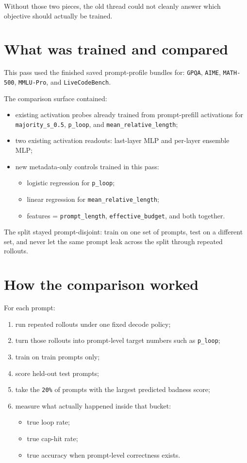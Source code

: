 \documentclass[11pt]{article}
\begin{document}
Without those two pieces, the old thread could not cleanly answer which
objective should actually be trained.

\section*{What was trained and compared}
This pass used the finished saved prompt-profile bundles for:
\texttt{GPQA}, \texttt{AIME}, \texttt{MATH-500}, \texttt{MMLU-Pro}, and
\texttt{LiveCodeBench}.

The comparison surface contained:
\begin{itemize}[leftmargin=1.5em]
\item existing activation probes already trained from prompt-prefill activations
for \texttt{majority\_s\_0.5}, \texttt{p\_loop}, and
\texttt{mean\_relative\_length};
\item two existing activation readouts: last-layer MLP and per-layer ensemble
MLP;
\item new metadata-only controls trained in this pass:
  \begin{itemize}[leftmargin=1.5em]
  \item logistic regression for \texttt{p\_loop};
  \item linear regression for \texttt{mean\_relative\_length};
  \item features = \texttt{prompt\_length}, \texttt{effective\_budget}, and
  both together.
  \end{itemize}
\end{itemize}

The split stayed prompt-disjoint: train on one set of prompts, test on a
different set, and never let the same prompt leak across the split through
repeated rollouts.

\section*{How the comparison worked}
For each prompt:
\begin{enumerate}[leftmargin=1.5em]
\item run repeated rollouts under one fixed decode policy;
\item turn those rollouts into prompt-level target numbers such as
\texttt{p\_loop};
\item train on train prompts only;
\item score held-out test prompts;
\item take the \texttt{20\%} of prompts with the largest predicted badness
score;
\item measure what actually happened inside that bucket:
  \begin{itemize}[leftmargin=1.5em]
  \item true loop rate;
  \item true cap-hit rate;
  \item true accuracy when prompt-level correctness exists.
  \end{itemize}
\end{enumerate}
\end{document}
